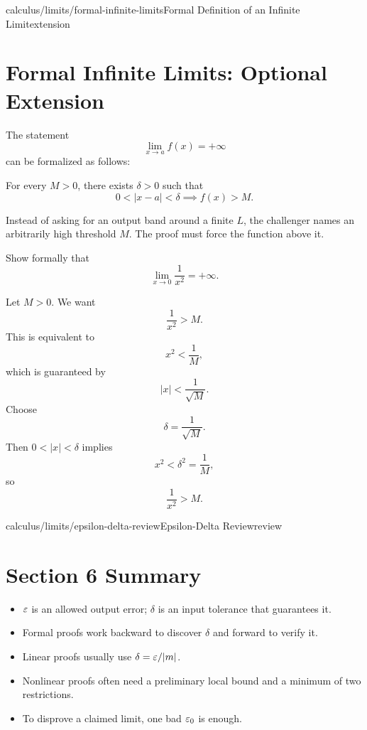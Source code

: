 \begin{webpage}{calculus/limits/formal-infinite-limits}{Formal Definition of an Infinite Limit}{extension}
\section{Formal Infinite Limits: Optional Extension}

The statement
\[
  \lim_{x\to a}f(x)=+\infty
\]
can be formalized as follows:

\begin{bgdefinition}[title={Formal Positive Infinite Limit}]
For every \(M>0\), there exists \(\delta>0\) such that
\[
  0<|x-a|<\delta\implies f(x)>M.
\]
\end{bgdefinition}

Instead of asking for an output band around a finite \(L\), the challenger names an arbitrarily high threshold \(M\). The proof must force the function above it.

\begin{bgguided}[title={\(1/x^2\to+\infty\)}]
Show formally that
\[
  \lim_{x\to0}\frac1{x^2}=+\infty.
\]

\begin{bgsolution}
Let \(M>0\). We want
\[
  \frac1{x^2}>M.
\]
This is equivalent to
\[
  x^2<\frac1M,
\]
which is guaranteed by
\[
  |x|<\frac1{\sqrt M}.
\]
Choose
\[
  \delta=\frac1{\sqrt M}.
\]
Then \(0<|x|<\delta\) implies
\[
  x^2<\delta^2=\frac1M,
\]
so
\[
  \frac1{x^2}>M.
\]
\end{bgsolution}
\end{bgguided}
\end{webpage}

\begin{webpage}{calculus/limits/epsilon-delta-review}{Epsilon-Delta Review}{review}
\section*{Section 6 Summary}

\begin{bgsummary}
\begin{itemize}
  \item \(\varepsilon\) is an allowed output error; \(\delta\) is an input tolerance that guarantees it.
  \item Formal proofs work backward to discover \(\delta\) and forward to verify it.
  \item Linear proofs usually use \(\delta=\varepsilon/|m|\).
  \item Nonlinear proofs often need a preliminary local bound and a minimum of two restrictions.
  \item To disprove a claimed limit, one bad \(\varepsilon_0\) is enough.
\end{itemize}
\end{bgsummary}
\end{webpage}

